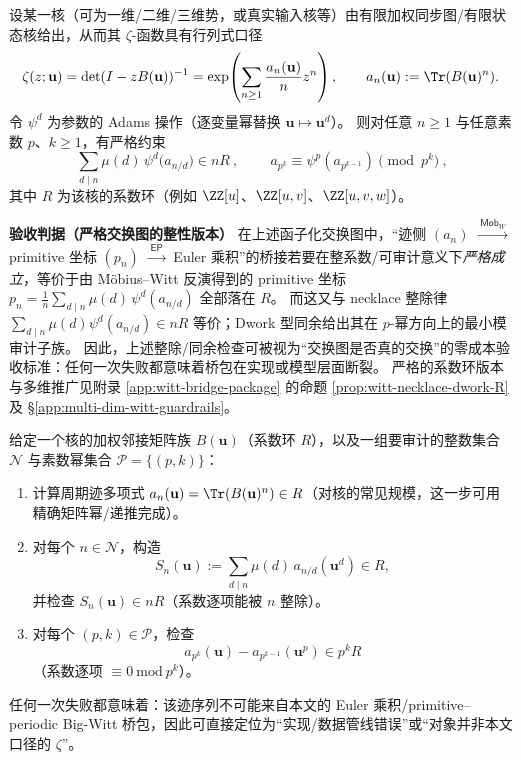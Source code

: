 \begin{remark}\label{cor:big-witt-audit-guardrails}
设某一核（可为一维/二维/三维势，或真实输入核等）由有限加权同步图/有限状态核给出，从而其 \(\zeta\)-函数具有行列式口径
\[
\zeta(z;\mathbf u)=\det(I-zB(\mathbf u))^{-1}=\exp\!\left(\sum_{n\ge 1}\frac{a_n(\mathbf u)}{n}z^n\right),
\qquad a_n(\mathbf u):=\Tr(B(\mathbf u)^n).
\]
令 \(\psi^d\) 为参数的 Adams 操作（逐变量幂替换 \(\mathbf u\mapsto \mathbf u^d\)）。
则对任意 \(n\ge 1\) 与任意素数 \(p\)、\(k\ge 1\)，有严格约束
\[
\boxed{\ \sum_{d\mid n}\mu(d)\,\psi^d\!\bigl(a_{n/d}\bigr)\in nR\ },
\qquad
\boxed{\ a_{p^k}\equiv \psi^p(a_{p^{k-1}})\pmod{p^k}\ },
\]
其中 \(R\) 为该核的系数环（例如 \(\ZZ[u]\)、\(\ZZ[u,v]\)、\(\ZZ[u,v,w]\)）。
\par
\medskip\noindent\textbf{验收判据（严格交换图的整性版本）}
在上述函子化交换图中，“迹侧 \((a_n)\) \(\xrightarrow{\ \mathsf{Mob}_W\ }\) primitive 坐标 \((p_n)\) \(\xrightarrow{\ \mathsf{EP}\ }\) Euler 乘积”的桥接若要在整系数/可审计意义下\emph{严格成立}，等价于由 Möbius--Witt 反演得到的 primitive 坐标 \(p_n=\frac1n\sum_{d\mid n}\mu(d)\,\psi^d(a_{n/d})\) 全部落在 \(R\)。
而这又与 necklace 整除律 \(\sum_{d\mid n}\mu(d)\psi^d(a_{n/d})\in nR\) 等价；Dwork 型同余给出其在 \(p\)-幂方向上的最小模审计子族。
因此，上述整除/同余检查可被视为“交换图是否真的交换”的零成本验收标准：任何一次失败都意味着桥包在实现或模型层面断裂。
严格的系数环版本与多维推广见附录 \ref{app:witt-bridge-package} 的命题 \ref{prop:witt-necklace-dwork-R} 及 \S\ref{app:multi-dim-witt-guardrails}。
\end{remark}

\begin{algorithm}\label{alg:self-audit-witt}
给定一个核的加权邻接矩阵族 \(B(\mathbf u)\)（系数环 \(R\)），以及一组要审计的整数集合 \(\mathcal N\) 与素数幂集合 \(\mathcal P=\{(p,k)\}\)：
\begin{enumerate}
  \item 计算周期迹多项式 \(a_n(\mathbf u)=\Tr(B(\mathbf u)^n)\in R\)（对核的常见规模，这一步可用精确矩阵幂/递推完成）。
  \item 对每个 \(n\in\mathcal N\)，构造
  \[
  S_n(\mathbf u):=\sum_{d\mid n}\mu(d)\,a_{n/d}(\mathbf u^d)\in R,
  \]
  并检查 \(S_n(\mathbf u)\in nR\)（系数逐项能被 \(n\) 整除）。
  \item 对每个 \((p,k)\in\mathcal P\)，检查
  \[
  a_{p^k}(\mathbf u)-a_{p^{k-1}}(\mathbf u^p)\in p^kR
  \]
  （系数逐项 \(\equiv 0\ \mathrm{mod}\ p^k\)）。
\end{enumerate}
任何一次失败都意味着：该迹序列不可能来自本文的 Euler 乘积/primitive--periodic Big-Witt 桥包，因此可直接定位为“实现/数据管线错误”或“对象并非本文口径的 \(\zeta\)”。
\end{algorithm}

